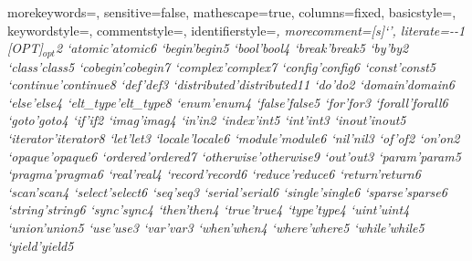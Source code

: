  {
    morekeywords={},
    sensitive=false,
    mathescape=true,
    columns=fixed,
    basicstyle=\footnotesize,
    keywordstyle=\footnotesize,
    commentstyle=\footnotesize\ttfamily,
    identifierstyle=\footnotesize\itshape,
    morecomment=[s]{`}{'},
    literate={-}{{\ttfamily -}}{1}
             {[OPT]}{{{\scriptsize $_{opt}$}}}{2}
             {`atomic'}{{\ttfamily atomic}}{6}
             {`begin'}{{\ttfamily begin}}{5}
             {`bool'}{{\ttfamily bool}}{4}
             {`break'}{{\ttfamily break}}{5}
             {`by'}{{\ttfamily by}}{2}
             {`class'}{{\ttfamily class}}{5}
             {`cobegin'}{{\ttfamily cobegin}}{7}
             {`complex'}{{\ttfamily complex}}{7}
             {`config'}{{\ttfamily config}}{6}
             {`const'}{{\ttfamily const}}{5}
             {`continue'}{{\ttfamily continue}}{8}
             {`def'}{{\ttfamily def}}{3}
             {`distributed'}{{\ttfamily distributed}}{11}
             {`do'}{{\ttfamily do}}{2}
             {`domain'}{{\ttfamily domain}}{6}
             {`else'}{{\ttfamily else}}{4}
             {`elt_type'}{{\ttfamily elt\_type}}{8}
             {`enum'}{{\ttfamily enum}}{4}
             {`false'}{{\ttfamily false}}{5}
             {`for'}{{\ttfamily for}}{3}
             {`forall'}{{\ttfamily forall}}{6}
             {`goto'}{{\ttfamily goto}}{4}
             {`if'}{{\ttfamily if}}{2}
             {`imag'}{{\ttfamily imag}}{4}
             {`in'}{{\ttfamily in}}{2}
             {`index'}{{\ttfamily int}}{5}
             {`int'}{{\ttfamily int}}{3}
             {`inout'}{{\ttfamily inout}}{5}
             {`iterator'}{{\ttfamily iterator}}{8}
             {`let'}{{\ttfamily let}}{3}
             {`locale'}{{\ttfamily locale}}{6}
             {`module'}{{\ttfamily module}}{6}
             {`nil'}{{\ttfamily nil}}{3}
             {`of'}{{\ttfamily of}}{2}
             {`on'}{{\ttfamily on}}{2}
             {`opaque'}{{\ttfamily opaque}}{6}
             {`ordered'}{{\ttfamily ordered}}{7}
             {`otherwise'}{{\ttfamily otherwise}}{9}
             {`out'}{{\ttfamily out}}{3}
             {`param'}{{\ttfamily param}}{5}
             {`pragma'}{{\ttfamily pragma}}{6}
             {`real'}{{\ttfamily real}}{4}
             {`record'}{{\ttfamily record}}{6}
             {`reduce'}{{\ttfamily reduce}}{6}
             {`return'}{{\ttfamily return}}{6}
             {`scan'}{{\ttfamily scan}}{4}
             {`select'}{{\ttfamily select}}{6}
             {`seq'}{{\ttfamily seq}}{3}
             {`serial'}{{\ttfamily serial}}{6}
             {`single'}{{\ttfamily single}}{6}
             {`sparse'}{{\ttfamily sparse}}{6}
             {`string'}{{\ttfamily string}}{6}
             {`sync'}{{\ttfamily sync}}{4}
             {`then'}{{\ttfamily then}}{4}
             {`true'}{{\ttfamily true}}{4}
             {`type'}{{\ttfamily type}}{4}
             {`uint'}{{\ttfamily uint}}{4}
             {`union'}{{\ttfamily union}}{5}
             {`use'}{{\ttfamily use}}{3}
             {`var'}{{\ttfamily var}}{3}
             {`when'}{{\ttfamily when}}{4}
             {`where'}{{\ttfamily where}}{5}
             {`while'}{{\ttfamily while}}{5}
             {`yield'}{{\ttfamily yield}}{5}
  }


\newcommand{\sntx}[1]{\lstinline[language=syntax]!#1!}

